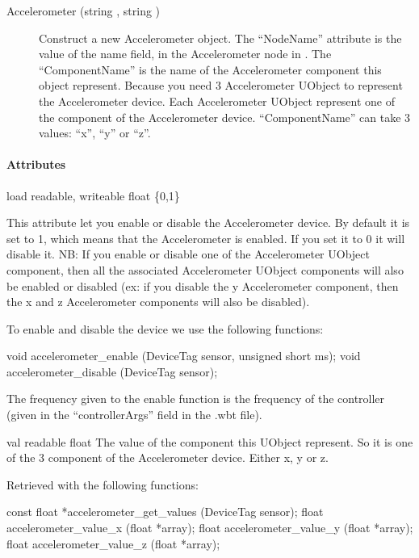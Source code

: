 \noindent
\begin{description}
\item[{Accelerometer (string , string
    )}] Construct a new Accelerometer object.  The
  ``NodeName'' attribute is the value of the name field, in the
  Accelerometer node in \webots.  The ``ComponentName'' is the name of
  the Accelerometer component this object represent.  Because you need
  3 Accelerometer UObject to represent the \webots Accelerometer
  device. Each Accelerometer UObject represent one of the component of
  the \webots Accelerometer device.  ``ComponentName'' can take 3
  values: ``x'', ``y'' or ``z''.
\end{description}

\paragraph{Attributes}

\noindent
\begin{itemize}
\begin{attribute}{load}
  {readable, writeable}
  {float}
  {\{0,1\}}

  This attribute let you enable or disable the Accelerometer device.
  By default it is set to 1, which means that the Accelerometer is
  enabled. If you set it to 0 it will disable it. NB: If you enable or
  disable one of the Accelerometer UObject component, then all the
  associated Accelerometer UObject components will also be enabled or
  disabled (ex: if you disable the y Accelerometer component, then the
  x and z Accelerometer components will also be disabled).

  To enable and disable the device we use the following \webots
  functions:

\begin{cxx}
void accelerometer_enable (DeviceTag sensor, unsigned short ms);
void accelerometer_disable (DeviceTag sensor);
\end{cxx}

    The frequency given to the enable function is the frequency of the
    \urbi controller (given in the ``controllerArgs'' field in the .wbt
    file).
\end{attribute}

\begin{attribute}{val}
  {readable}
  {float}
  {}
  The value of the component this UObject represent. So
  it is one of the 3 component of the \webots Accelerometer
  device. Either x, y or z.


  Retrieved with the following \webots functions:


\begin{cxx}
const float *accelerometer_get_values (DeviceTag sensor);
float accelerometer_value_x (float *array);
float accelerometer_value_y (float *array);
float accelerometer_value_z (float *array);
\end{cxx}
\end{attribute}

\end{itemize}

